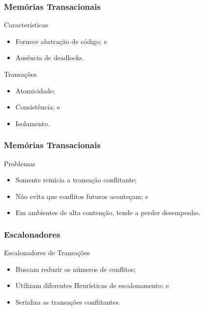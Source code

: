 \documentclass[10pt, pdf,xcolor=pdftex,dvipsnames,table]{beamer}
\begin{document}
\begin{frame} \frametitle{Memórias Transacionais}
    \begin{block}{Características}
        \begin{itemize}
        	\item Fornece abstração de código; e
        	\item Ausência de deadlocks.
        \end{itemize}
    \end{block}
    
    \begin{block}{Transações}
        \begin{itemize}
        	\item Atomicidade;
        	\item Consistência; e
        	\item Isolamento.
        \end{itemize}
    \end{block}
\end{frame}

\begin{frame} \frametitle{Memórias Transacionais}
    \begin{alertblock}{Problemas}
        \begin{itemize}
        	\item Somente reinicia a transação conflitante;
        	\item Não evita que conflitos futuros aconteçam; e
        	\item Em ambientes de alta contenção, tende a perder desempenho.
        \end{itemize}
    \end{alertblock}
\end{frame}

\begin{frame} \frametitle{Escalonadores}
\begin{block}{Escalonadores de Transações}
\begin{itemize}
	\item Buscam reduzir os números de conflitos;
	\item Utilizam diferentes Heurísticas de escalonamento; e
	\item Serializa as transações conflitantes.
\end{itemize}
\end{block}
\end{frame}
\end{document}
